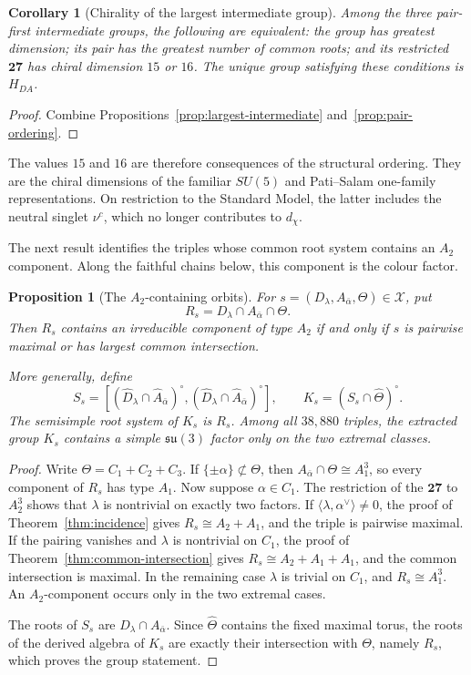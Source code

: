 \documentclass[11pt]{article}
\newtheorem{proposition}[theorem]{Proposition}
\newtheorem{corollary}[theorem]{Corollary}
\theoremstyle{remark}
\begin{document}
\begin{corollary}[Chirality of the largest intermediate group]
\label{cor:pair-first}
Among the three pair-first intermediate groups, the following are equivalent:
the group has greatest dimension; its pair has the greatest number of
common roots; and its restricted \(\mathbf{27}\) has chiral dimension
\(15\) or \(16\). The unique group satisfying these conditions is
\(H_{DA}\).
\end{corollary}
\begin{proof}
Combine Propositions~\ref{prop:largest-intermediate} and~\ref{prop:pair-ordering}.
\end{proof}

The values \(15\) and \(16\) are therefore consequences of the structural
ordering. They are the chiral dimensions of the familiar \(SU(5)\) and
Pati--Salam one-family representations. On restriction to the Standard
Model, the latter includes the neutral singlet \(\nu^c\), which no
longer contributes to \(d_\chi\).

The next result identifies the triples whose common root system contains an
\(A_2\) component. Along the faithful chains below, this component is the
colour factor.

\begin{proposition}[The \(A_2\)-containing orbits]
\label{prop:color-extrema}
For \(s=(D_\lambda,A_{\bar\alpha},\Theta)\in\mathcal X\), put
\[
 R_s=D_\lambda\cap A_{\bar\alpha}\cap\Theta.
\]
Then \(R_s\) contains an irreducible component of type \(A_2\) if and only
if \(s\) is pairwise maximal or has largest common intersection.

More generally, define
\[
 S_s=[(\widehat D_\lambda\cap\widehat A_{\bar\alpha})^\circ,
       (\widehat D_\lambda\cap\widehat A_{\bar\alpha})^\circ],
 \qquad
 K_s=(S_s\cap\widehat\Theta)^\circ.
\]
The semisimple root system of \(K_s\) is \(R_s\). Among all
\(38{,}880\) triples, the extracted group \(K_s\) contains a simple
\(\mathfrak{su}(3)\) factor only on the two extremal classes.
\end{proposition}
\begin{proof}
Write \(\Theta=C_1+C_2+C_3\). If
\(\{\pm\alpha\}\not\subset\Theta\), then
\(A_{\bar\alpha}\cap\Theta\cong A_1^3\), so every component of
\(R_s\) has type \(A_1\). Now suppose
\(\alpha\in C_1\). The restriction of the \(\mathbf{27}\) to
\(A_2^3\) shows that \(\lambda\) is nontrivial on exactly two factors.
If \(\langle\lambda,\alpha^\vee\rangle\ne0\), the proof of
Theorem~\ref{thm:incidence} gives
\(R_s\cong A_2+A_1\), and the triple is pairwise maximal. If the pairing
vanishes and \(\lambda\) is nontrivial on \(C_1\), the proof of
Theorem~\ref{thm:common-intersection} gives
\(R_s\cong A_2+A_1+A_1\), and the common intersection is maximal. In the
remaining case \(\lambda\) is trivial on \(C_1\), and
\(R_s\cong A_1^3\). An \(A_2\)-component occurs only in the two
extremal cases.

The roots of \(S_s\) are \(D_\lambda\cap A_{\bar\alpha}\). Since
\(\widehat\Theta\) contains the fixed maximal torus, the roots of the
derived algebra of \(K_s\) are exactly their intersection with \(\Theta\),
namely \(R_s\), which proves the group statement.
\end{proof}
\end{document}

